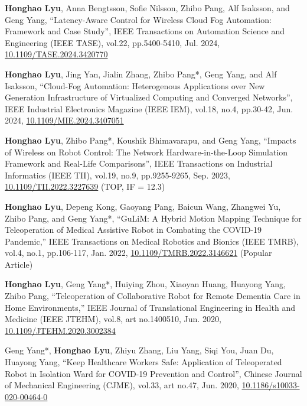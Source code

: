\begin{enumerate}[align=left, widest={[\textbf{S.1}]}, itemindent=0em, label={\textbf{[\arabic*]}]
    \item[\textbf{[J.22]}] \textbf{Honghao Lyu}, Anna Bengtsson, Sofie Nilsson, Zhibo Pang, Alf Isaksson, and Geng Yang, ``Latency-Aware Control for Wireless Cloud Fog Automation: Framework and Case Study'', IEEE Transactions on Automation Science and Engineering (IEEE TASE), vol.22, pp.5400-5410, Jul. 2024, \href{http://doi.org/10.1109/TASE.2024.3420770}{10.1109/TASE.2024.3420770}
    \item[\textbf{[J.21]}] \textbf{Honghao Lyu}, Jing Yan, Jialin Zhang, Zhibo Pang*, Geng Yang, and Alf Isaksson, ``Cloud-Fog Automation: Heterogenous Applications over New Generation Infrastructure of Virtualized Computing and Converged Networks'', IEEE Industrial Electronics Magazine (IEEE IEM), vol.18, no.4, pp.30-42, Jun. 2024, \href{http://doi.org/10.1109/MIE.2024.3407051}{10.1109/MIE.2024.3407051}
    \item[\textbf{[J.20]}] \textbf{Honghao Lyu}, Zhibo Pang*, Koushik Bhimavarapu, and Geng Yang, ``Impacts of Wireless on Robot Control: The Network Hardware-in-the-Loop Simulation Framework and Real-Life Comparisons'', IEEE Transactions on Industrial Informatics (IEEE TII), vol.19, no.9, pp.9255-9265, Sep. 2023, \href{http://doi.org/10.1109/TII.2022.3227639}{10.1109/TII.2022.3227639} (TOP, IF = 12.3)
    \item[\textbf{[J.19]}] \textbf{Honghao Lyu}, Depeng Kong, Gaoyang Pang, Baicun Wang, Zhangwei Yu, Zhibo Pang, and Geng Yang*, ``GuLiM: A Hybrid Motion Mapping Technique for Teleoperation of Medical Assistive Robot in Combating the COVID-19 Pandemic,'' IEEE Transactions on Medical Robotics and Bionics (IEEE TMRB), vol.4, no.1, pp.106-117, Jan. 2022, \href{http://doi.org/10.1109/TMRB.2022.3146621}{10.1109/TMRB.2022.3146621} (Popular Article)
    \item[\textbf{[J.18]}] \textbf{Honghao Lyu}, Geng Yang*, Huiying Zhou, Xiaoyan Huang, Huayong Yang, Zhibo Pang, ``Teleoperation of Collaborative Robot for Remote Dementia Care in Home Environments,'' IEEE Journal of Translational Engineering in Health and Medicine (IEEE JTEHM), vol.8, art no.1400510, Jun. 2020, \href{http://doi.org/10.1109/JTEHM.2020.3002384}{10.1109/JTEHM.2020.3002384}
    \item[\textbf{[J.17]}] Geng Yang*, \textbf{Honghao Lyu}, Zhiyu Zhang, Liu Yang, Siqi You, Juan Du, Huayong Yang, ``Keep Healthcare Workers Safe: Application of Teleoperated Robot in Isolation Ward for COVID-19 Prevention and Control'', Chinese Journal of Mechanical Engineering (CJME), vol.33, art no.47, Jun. 2020, \href{http://doi.org/10.1186/s10033-020-00464-0}{10.1186/s10033-020-00464-0}

\end{enumerate}
